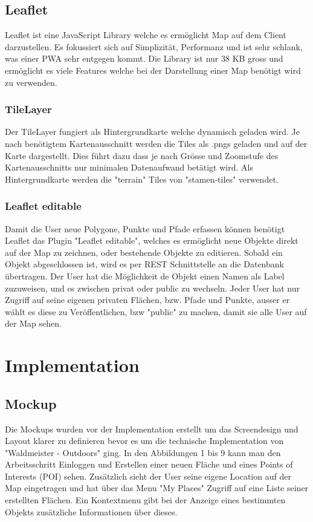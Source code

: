 \section{Leaflet}
Leaflet ist eine JavaScript Library welche es erm\"oglicht Map auf dem Client darzustellen. Es fokussiert sich auf Simplizit\"at, Performanz und ist sehr schlank, was einer PWA sehr entgegen kommt. Die Library ist nur 38 KB gross und erm\"oglicht es viele Features welche bei der Darstellung einer Map ben\"otigt wird zu verwenden. 

\subsection{TileLayer}
Der TileLayer fungiert als Hintergrundkarte welche dynamisch geladen wird. Je nach ben\"otigtem Kartenausschnitt werden die Tiles als .pngs geladen und auf der Karte dargestellt. Dies f\"uhrt dazu dass je nach Gr\"osse und Zoomstufe des Kartenausschnitts nur minimalen Datenaufwand bet\"atigt wird. Als Hintergrundkarte werden die "terrain" Tiles von "stamen-tiles" verwendet.

\subsection{Leaflet editable}
Damit die User neue Polygone, Punkte und Pfade erfassen k\"onnen ben\"otigt Leaflet das Plugin "Leaflet editable", welches es erm\"oglicht neue Objekte direkt auf der Map zu zeichnen, oder bestehende Objekte zu editieren. Sobald ein Objekt abgeschlossen ist, wird es per REST Schnittstelle an die Datenbank \"ubertragen. Der User hat die M\"oglichkeit de Objekt einen Namen als Label zuzuweisen, und es zwischen privat oder public zu wechseln. Jeder User hat nur Zugriff auf seine eigenen privaten Fl\"achen, bzw. Pfade und Punkte, ausser er w\"ahlt es diese zu Ver\"offentlichen, bzw "public" zu machen, damit sie alle User auf der Map sehen.

\chapter{Implementation}

\section{Mockup}
Die Mockups wurden vor der Implementation erstellt um das Screendesign und Layout klarer zu definieren bevor es um die technische Implementation von "Waldmeister - Outdoors" ging. In den Abbildungen 1 bis 9 kann man den Arbeitsschritt Einloggen und Erstellen einer neuen Fl\"ache und eines Points of Interests (POI) sehen. Zus\"atzlich sieht der User seine eigene Location auf der Map eingetragen und hat \"uber das Menu "My Places" Zugriff auf eine Liste seiner erstellten Fl\"achen. Ein Kontextmenu gibt bei der Anzeige eines bestimmten Objekts zus\"atzliche Informationen \"uber dieses.

